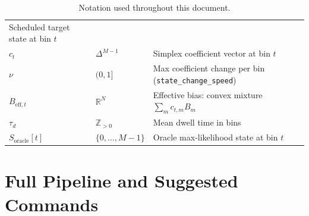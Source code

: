 \documentclass[11pt]{article}
\begin{document}
\begin{table}[htbp]
\begin{tabular}{lll}
  Scheduled target state at bin $t$ \\
$c_t$ & $\Delta^{M-1}$ &
  Simplex coefficient vector at bin $t$ \\
$\nu$ & $(0,1]$ &
  Max coefficient change per bin (\texttt{state\_change\_speed}) \\
$B_{\mathrm{eff},t}$ & $\mathbb{R}^N$ &
  Effective bias: convex mixture $\sum_m c_{t,m} B_m$ \\
$\tau_d$ & $\mathbb{Z}_{>0}$ &
  Mean dwell time in bins \\
$S_{\text{oracle}}[t]$ & $\{0,\dots,M-1\}$ &
  Oracle max-likelihood state at bin $t$ \\
\bottomrule
\end{tabular}
\caption{Notation used throughout this document.}
\label{tab:notation}
\end{table}

\section{Full Pipeline and Suggested Commands}
\label{sec:pipeline}
\end{document}
